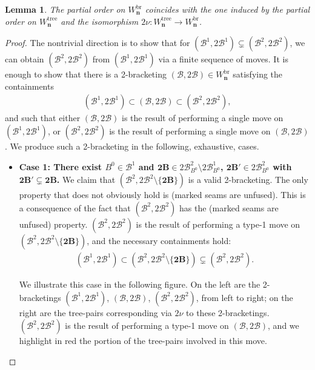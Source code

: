 \documentclass[11pt]{amsart}
\newtheorem{lemma}[theorem]{Lemma}
\theoremstyle{definition}
\theoremstyle{remark}
\theoremstyle{plain}
\newcommand\bn{\mathbf{n}}
\newcommand{\btB}{{\mathbf{2B}}}
\newcommand{\sB}{\mathscr{B}}
\newcommand{\stB}{2\mathscr{B}}
\newcommand{\on}{\operatorname}
\newcommand{\tree}{{\on{tree}}}
\newcommand{\br}{{\on{br}}}
\begin{document}

\begin{lemma}
\label{lem:Wn_models_orders}
The partial order on $W_\bn^\br$ coincides with the one induced by the partial order on $W_\bn^\tree$ and the isomorphism $2\nu\colon W_\bn^\tree \to W_\bn^\br$.
\end{lemma}

\begin{proof}
The nontrivial direction is to show that for $(\sB^1,\stB^1) \subsetneq (\sB^2,\stB^2)$, we can obtain $(\sB^2,\stB^2)$ from $(\sB^1,\stB^1)$ via a finite sequence of moves.
It is enough to show that there is a 2-bracketing $(\sB, \stB) \in W_\bn^\br$ satisfying the containments
\begin{align}
(\sB^1,\stB^1) \subset (\sB, \stB) \subset (\sB^2,\stB^2),
\end{align}
and such that either $(\sB,\stB)$ is the result of performing a single move on $(\sB^1,\stB^1)$, or $(\sB^2,\stB^2)$ is the result of performing a single move on $(\sB,\stB)$.
We produce such a 2-bracketing in the following, exhaustive, cases.
\begin{itemize}
\item[] {\bf Case 1: There exist $B^0 \in \sB^1$ and $\btB \in \stB^2_{B^0}\setminus \stB^1_{B^0}$, $\btB' \in \stB^2_{B^0}$ with $\btB' \subsetneq \btB$.}
We claim that $(\sB^2, \stB^2 \setminus \{\btB\})$ is a valid 2-bracketing.
The only property that does not obviously hold is {\sc(marked seams are unfused)}.
This is a consequence of the fact that $(\sB^2,\stB^2)$ has the {\sc(marked seams are unfused)} property.
$(\sB^2,\stB^2)$ is the result of performing a type-1 move on $(\sB^2,\stB^2\setminus\{\btB\})$, and the necessary containments hold:
\begin{align}
(\sB^1,\stB^1) \subset (\sB^2,\stB^2\setminus\{\btB\}) \subsetneq (\sB^2,\stB^2).
\end{align}


We illustrate this case in the following figure.
On the left are the 2-bracketings $(\sB^1,\stB^1)$, $(\sB,\stB)$, $(\sB^2,\stB^2)$, from left to right; on the right are the tree-pairs corresponding via $2\nu$ to these 2-bracketings.
$(\sB^2,\stB^2)$ is the result of performing a type-1 move on $(\sB,\stB)$, and we highlight in red the portion of the tree-pairs involved in this move.

\begin{figure}[H]
\centering
\def\svgwidth{0.975\columnwidth}

\label{fig:2nu_poset_map_example_1}
\end{figure}


\end{itemize}
\end{proof}
\end{document}
